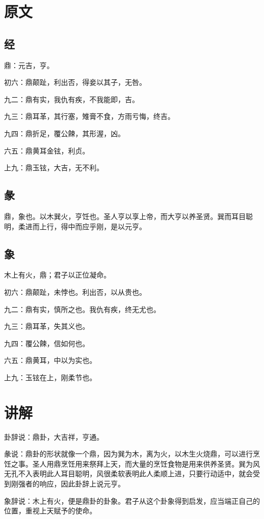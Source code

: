 \documentclass[12pt,oneside]{book}
\begin{document}
\section{原文}

\subsection{经}
鼎：元吉，亨。

初六：鼎颠趾，利出否，得妾以其子，无咎。

九二：鼎有实，我仇有疾，不我能即，吉。

九三：鼎耳革，其行塞，雉膏不食，方雨亏悔，终吉。

九四：鼎折足，覆公餗，其形渥，凶。

六五：鼎黄耳金铉，利贞。

上九：鼎玉铉，大吉，无不利。

\subsection{彖}
鼎，象也。以木巽火，亨饪也。圣人亨以享上帝，而大亨以养圣贤。巽而耳目聪明，柔进而上行，得中而应乎刚，是以元亨。

\subsection{象}
木上有火，鼎；君子以正位凝命。

初六：鼎颠趾，未悖也。利出否，以从贵也。

九二：鼎有实，慎所之也。我仇有疾，终无尤也。

九三：鼎耳革，失其义也。

九四：覆公餗，信如何也。

六五：鼎黄耳，中以为实也。

上九：玉铉在上，刚柔节也。

\section{讲解}
卦辞说：鼎卦，大吉祥，亨通。

彖说：鼎卦的形状就像一个鼎，因为巽为木，离为火，以木生火烧鼎，可以进行烹饪之事。圣人用鼎烹饪用来祭拜上天，而大量的烹饪食物是用来供养圣贤。巽为风无孔不入表明此人耳目聪明，风很柔软表明此人柔顺上进，只要行动适中，就会受到刚强者的响应，因此卦辞上说元亨。

象辞说：木上有火，便是鼎卦的卦象。君子从这个卦象得到启发，应当端正自己的位置，重视上天赋予的使命。
\end{document}
